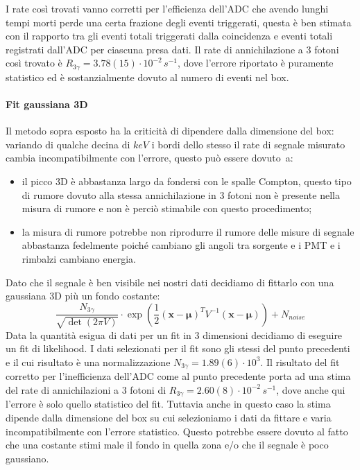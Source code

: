 I rate così trovati vanno corretti per l'efficienza dell'ADC che avendo lunghi tempi morti perde una certa frazione degli eventi triggerati, questa è ben stimata con il rapporto tra gli eventi totali triggerati dalla coincidenza e eventi totali registrati dall'ADC per ciascuna presa dati.
Il rate di annichilazione a 3 fotoni così trovato è $R_{3\gamma} = 3.78(15)\cdot 10^{-2}\,\si{s^{-1}}$, dove l'errore riportato è puramente statistico ed è sostanzialmente dovuto al numero di eventi nel box.

\paragraph{Fit gaussiana 3D}
Il metodo sopra esposto ha la criticità di dipendere dalla dimensione del box: variando di qualche decina di $\si{keV}$ i bordi dello stesso il rate di segnale misurato cambia incompatibilmente con l'errore, questo può essere dovuto~a:
\begin{itemize}
	\item il picco 3D è abbastanza largo da fondersi con le spalle Compton, questo tipo di rumore dovuto alla stessa annichilazione in 3 fotoni non è presente nella misura di rumore e non è perciò stimabile con questo procedimento;
	\item la misura di rumore potrebbe non riprodurre il rumore delle misure di segnale abbastanza fedelmente poiché cambiano gli angoli tra sorgente e i PMT e i rimbalzi cambiano energia.
\end{itemize}
Dato che il segnale è ben visibile nei nostri dati decidiamo di fittarlo con una gaussiana 3D più un fondo costante: 
\begin{equation*}
\frac{N_{3\gamma}}{\sqrt{\det(2\pi V)}} \cdot \exp \left( \frac{1}{2} (\textbf{x}-\boldsymbol{\mu})^T V^{-1}( \textbf{x}-\boldsymbol{\mu} ) \right) + N_{noise}
\end{equation*}
Data la quantità esigua di dati per un fit in 3 dimensioni decidiamo di eseguire un fit di likelihood. I dati selezionati per il fit sono gli stessi del punto precedenti e il cui risultato è una normalizzazione $N_{3\gamma} = 1.89(6)\cdot 10^3$. Il risultato del fit corretto per l'inefficienza dell'ADC come al punto precedente porta ad una stima del rate di annichilazioni a 3 fotoni di $R_{3\gamma} = 2.60(8)\cdot 10^{-2}\,\si{s^{-1}}$, dove anche qui l'errore è solo quello statistico del fit.
Tuttavia anche in questo caso la stima dipende dalla dimensione del box su cui selezioniamo i dati da fittare e varia incompatibilmente con l'errore statistico. Questo potrebbe essere dovuto al fatto che una costante stimi male il fondo in quella zona e/o che il segnale è poco gaussiano.

